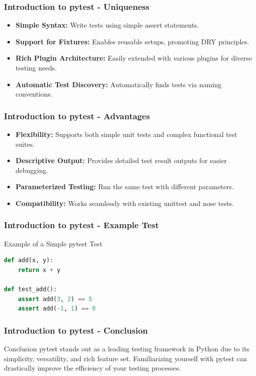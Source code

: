 \documentclass{beamer}
\begin{document}
\begin{frame}[fragile]
    \frametitle{Introduction to pytest - Uniqueness}
    \begin{itemize}
        \item \textbf{Simple Syntax:} Write tests using simple assert statements.
        \item \textbf{Support for Fixtures:} Enables reusable setups, promoting DRY principles.
        \item \textbf{Rich Plugin Architecture:} Easily extended with various plugins for diverse testing needs.
        \item \textbf{Automatic Test Discovery:} Automatically finds tests via naming conventions.
    \end{itemize}
\end{frame}

\begin{frame}[fragile]
    \frametitle{Introduction to pytest - Advantages}
    \begin{itemize}
        \item \textbf{Flexibility:} Supports both simple unit tests and complex functional test suites.
        \item \textbf{Descriptive Output:} Provides detailed test result outputs for easier debugging.
        \item \textbf{Parameterized Testing:} Run the same test with different parameters.
        \item \textbf{Compatibility:} Works seamlessly with existing unittest and nose tests.
    \end{itemize}
\end{frame}

\begin{frame}[fragile]
    \frametitle{Introduction to pytest - Example Test}
    \begin{block}{Example of a Simple pytest Test}
        \begin{lstlisting}[language=Python]
def add(x, y):
    return x + y

def test_add():
    assert add(3, 2) == 5
    assert add(-1, 1) == 0
        \end{lstlisting}
    \end{block}
\end{frame}

\begin{frame}[fragile]
    \frametitle{Introduction to pytest - Conclusion}
    \begin{block}{Conclusion}
        pytest stands out as a leading testing framework in Python due to its simplicity, versatility, and rich feature set.
        Familiarizing yourself with pytest can drastically improve the efficiency of your testing processes.
    \end{block}
\end{frame}
\end{document}
